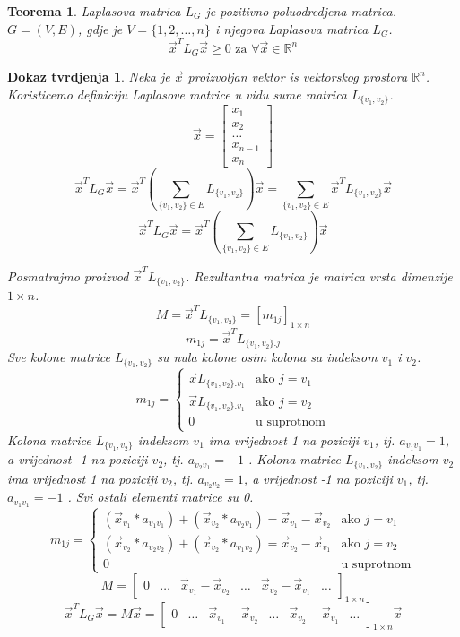 \documentclass[11pt]{article}
\newtheorem{theorem}{Teorema}
\newtheorem*{custom_proof}{Dokaz tvrdjenja}
\begin{document}
	\begin{theorem} Laplasova matrica $L_G$ je pozitivno poluodredjena matrica.
	$G = (V, E)$, gdje je $V = \{1, 2, \dots, n\}$ i njegova Laplasova matrica $L_G$. 
	\[
	  \vec{x}^TL_G\vec{x} \geq 0 \text{ za } \forall \vec{x} \in \mathbb{R}^n
	\] 
	\end{theorem}
	\begin{custom_proof}
	Neka je $\vec{x}$ proizvoljan vektor is vektorskog prostora $\mathbb{R}^n$. Koristicemo definiciju Laplasove matrice u vidu sume matrica $L_{\{v_1,v_2\}}$.
	\[
	\vec{x} = 
	\begin{bmatrix} 
	x_1 \\ x_2 \\ \dots \\ x_{n-1} \\ x_n
	\end{bmatrix}
	\]
	\[
	  \vec{x}^TL_G\vec{x} = \vec{x}^T (\sum_{\{v_1,v_2\} \in E} L_{\{v_1,v_2\}}) \vec{x}  =  \sum_{\{v_1,v_2\} \in E} \vec{x}^TL_{\{v_1,v_2\}} \vec{x}
	\]
	\[
	  \vec{x}^TL_G\vec{x} =\vec{x}^T (\sum_{\{v_1,v_2\} \in E} L_{\{v_1,v_2\}}) \vec{x} 
	\]  
	
	Posmatrajmo proizvod $\vec{x}^T L_{\{v_1,v_2\}}$. Rezultantna matrica je matrica vrsta dimenzije $1 \times n$.
	\[
	M = \vec{x}^T L_{\{v_1,v_2\}} = [m_{1j}]_{1 \times n}
	\]
	\[
	m_{1j} = \vec{x}^T L_{\{v_1,v_2\} . j}
	\]
	Sve kolone matrice $L_{\{v_1,v_2\}}$ su nula kolone osim kolona sa indeksom $v_1$ i $v_2$.
	\[
	 m_{1j} =
	 \begin{cases}
	 \vec{x} L_{\{v_1,v_2\} . v_1}  & \text{ako } j = v_1 \\ 
	 \vec{x} L_{\{v_1,v_2\} . v_1}  & \text{ako } j = v_2  \\ 
	 0  & \text{u suprotnom}
	 \end{cases}
	\]
	Kolona matrice $L_{\{v_1,v_2\}}$ indeksom $v_1$ ima vrijednost 1 na poziciji $v_1$, tj. $a_{v_1 v_1} = 1$, a vrijednost -1 na poziciji $v_2$, tj. $a_{v_2 v_1} = -1$ .
	Kolona matrice $L_{\{v_1,v_2\}}$ indeksom $v_2$ ima vrijednost 1 na poziciji $v_2$, tj. $a_{v_2 v_2} = 1$, a vrijednost -1 na poziciji $v_1$, tj. $a_{v_1 v_1} = -1$ .
	Svi ostali elementi matrice su 0.
	\[
	 m_{1j} =
	 \begin{cases}
	 (\vec{x}_{v_1} * a_{v_1 v_1}) + (\vec{x}_{v_2} * a_{v_2 v_1}) = \vec{x}_{v_1} - \vec{x}_{v_2}   & \text{ako } j = v_1 \\ 
	 (\vec{x}_{v_2} * a_{v_2 v_2}) + (\vec{x}_{v_2} * a_{v_1 v_2}) = \vec{x}_{v_2} - \vec{x}_{v_1}  & \text{ako } j = v_2  \\ 
	 0  & \text{u suprotnom}
	 \end{cases}
	\]
	\[
	M = 
	\begin{bmatrix} 
	0 & \dots &  \vec{x}_{v_1} - \vec{x}_{v_2} & \dots &  \vec{x}_{v_2} - \vec{x}_{v_1} & \dots
	\end{bmatrix}
	_{1 \times n}
	\]
	\[
	  \vec{x}^TL_G\vec{x} = M \vec{x} =\begin{bmatrix} 
	0 & \dots &  \vec{x}_{v_1} - \vec{x}_{v_2} & \dots &  \vec{x}_{v_2} - \vec{x}_{v_1} & \dots
	\end{bmatrix}
	_{1 \times n} \vec{x}  
	\]
	

\end{custom_proof}
\end{document}
